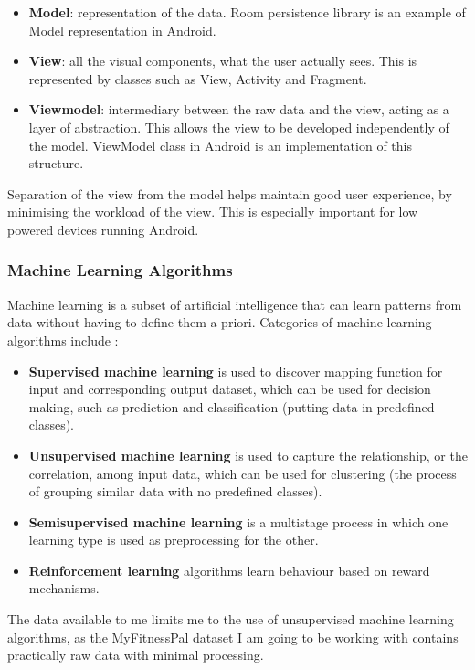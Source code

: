 \documentclass{article}
\begin{document}
\begin{itemize}
    \item \textbf{Model}: representation of the data. Room persistence library \cite{android_room} is an example of Model representation in Android.
    \item \textbf{View}: all the visual components, what the user actually sees. This is represented by classes such as View, Activity and Fragment. 
    \item \textbf{Viewmodel}: intermediary between the raw data and the view, acting as a layer of abstraction. This allows the view to be developed independently of the model. ViewModel class in Android is an implementation of this structure. 
\end{itemize}

\bigskip
\noindent Separation of the view from the model helps maintain good user experience, by minimising the workload of the view. This is especially important for low powered devices running Android. 

\subsubsection{Machine Learning Algorithms}
Machine learning is a subset of artificial intelligence that can learn patterns from data without having to define them a priori. Categories of machine learning algorithms include \cite{ml_enterprises}:

\begin{itemize}
  \item \textbf{Supervised machine learning} is used to discover mapping function for input and corresponding output dataset, which can be used for decision making, such as prediction and classification (putting data in predefined classes).
  \item \textbf{Unsupervised machine learning} is used to capture the relationship, or the correlation, among input data, which can be used for clustering (the process of grouping similar data with no predefined classes).
  \item \textbf{Semisupervised machine learning} is a multistage process in which one learning type is used as preprocessing for the other.
  \item \textbf{Reinforcement learning} algorithms learn behaviour based on reward mechanisms.
\end{itemize}

\noindent The data available to me limits me to the use of unsupervised machine learning algorithms, as the MyFitnessPal dataset \cite{diet_success_predictions} I am going to be working with contains practically raw data with minimal processing.
\end{document}
